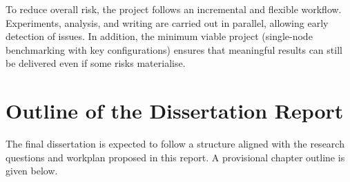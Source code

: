 \documentclass{article}
\begin{document}
To reduce overall risk, the project follows an incremental and flexible workflow. 
Experiments, analysis, and writing are carried out in parallel, allowing early detection of issues. 
In addition, the minimum viable project (single-node benchmarking with key configurations) ensures that meaningful results can still be delivered even if some risks materialise.


\section{Outline of the Dissertation Report}\label{s:dissertation_outline}

The final dissertation is expected to follow a structure aligned with the research questions and workplan proposed in this report. 
A provisional chapter outline is given below.
\end{document}
